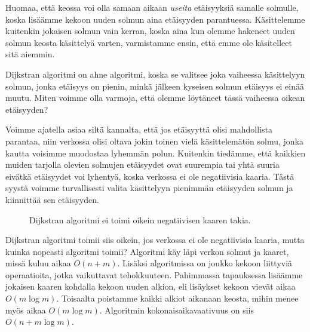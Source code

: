 Huomaa, että keossa voi olla samaan aikaan \emph{useita} etäisyyksiä
samalle solmulle, koska lisäämme kekoon uuden solmun
aina etäisyyden parantuessa.
Käsittelemme kuitenkin jokaisen solmun vain kerran,
koska aina kun olemme hakeneet uuden solmun keosta käsittelyä varten,
varmistamme ensin, että emme ole käsitelleet sitä aiemmin.

Dijkstran algoritmi on ahne algoritmi,
koska se valitsee joka vaiheessa käsittelyyn solmun,
jonka etäisyys on pienin, minkä jälkeen kyseisen
solmun etäisyys ei einää muutu.
Miten voimme olla varmoja, että olemme löytäneet
tässä vaiheessa oikean etäisyyden?

Voimme ajatella asiaa siltä kannalta,
että jos etäisyyttä olisi mahdollista parantaa,
niin verkossa olisi oltava jokin toinen vielä
käsittelemätön solmu, jonka kautta voisimme muodostaa lyhemmän polun.
Kuitenkin tiedämme, että kaikkien muiden tarjolla olevien solmujen
etäisyydet ovat suurempia tai yhtä suuria eivätkä etäisyydet voi lyhentyä,
koska verkossa ei ole negatiivisia kaaria.
Tästä syystä voimme turvallisesti valita käsittelyyn pienimmän etäisyyden
solmun ja kiinnittää sen etäisyyden.

\begin{figure}
\center
\begin{center}
\end{center}
\caption{Dijkstran algoritmi ei toimi oikein negatiivisen kaaren takia.}
\label{fig:dijneg}
\end{figure}

Dijkstran algoritmi toimii siis oikein,
jos verkossa ei ole negatiivisia kaaria,
mutta kuinka nopeasti algoritmi toimii?
Algoritmi käy läpi verkon solmut
ja kaaret, missä kuluu aikaa $O(n+m)$.
Lisäksi algoritmissa on joukko kekoon liittyviä operaatioita,
jotka vaikuttavat tehokkuuteen.
Pahimmassa tapauksessa lisäämme jokaisen kaaren kohdalla
kekoon uuden alkion, eli lisäykset kekoon vievät aikaa $O(m \log m)$.
Toisaalta poistamme kaikki alkiot aikanaan keosta,
mihin menee myös aikaa $O(m \log m)$.
Algoritmin kokonaisaikavaativuus on siis $O(n + m \log m)$.

